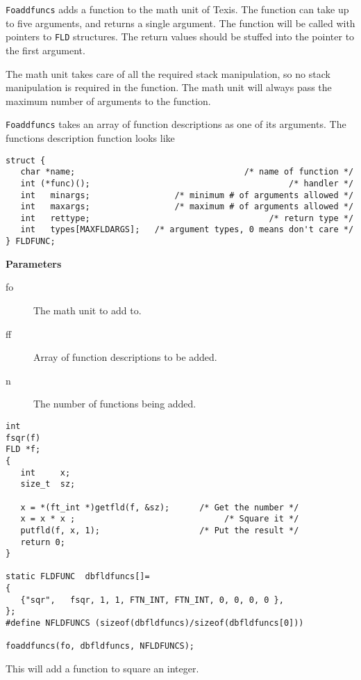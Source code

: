 \DESCRIPTION

{\tt Foaddfuncs} adds a function to the math unit of Texis.  The function
can take up to five arguments, and returns a single argument.  The function
will be called with pointers to {\tt FLD} structures.  The return values
should be stuffed into the pointer to the first argument.

The math unit takes care of all the required stack manipulation, so no
stack manipulation is required in the function. The math unit will
always pass the maximum number of arguments to the function.

{\tt Foaddfuncs} takes an array of function descriptions as one of its
arguments.  The functions description function looks like
\begin{verbatim}
struct {
   char *name;                                  /* name of function */
   int (*func)();                                        /* handler */
   int   minargs;                 /* minimum # of arguments allowed */
   int   maxargs;                 /* maximum # of arguments allowed */
   int   rettype;                                    /* return type */
   int   types[MAXFLDARGS];   /* argument types, 0 means don't care */
} FLDFUNC;
\end{verbatim}

{\bf Parameters}
\begin{description}
\item[fo] The math unit to add to.
\item[ff] Array of function descriptions to be added.
\item[n] The number of functions being added.
\end{description}

\EXAMPLE
\begin{verbatim}
int
fsqr(f)
FLD *f;
{
   int     x;
   size_t  sz;

   x = *(ft_int *)getfld(f, &sz);      /* Get the number */
   x = x * x ;                              /* Square it */
   putfld(f, x, 1);                    /* Put the result */
   return 0;
}

static FLDFUNC  dbfldfuncs[]=
{
   {"sqr",   fsqr, 1, 1, FTN_INT, FTN_INT, 0, 0, 0, 0 },
};
#define NFLDFUNCS (sizeof(dbfldfuncs)/sizeof(dbfldfuncs[0]))

foaddfuncs(fo, dbfldfuncs, NFLDFUNCS);
\end{verbatim}

This will add a function to square an integer.


